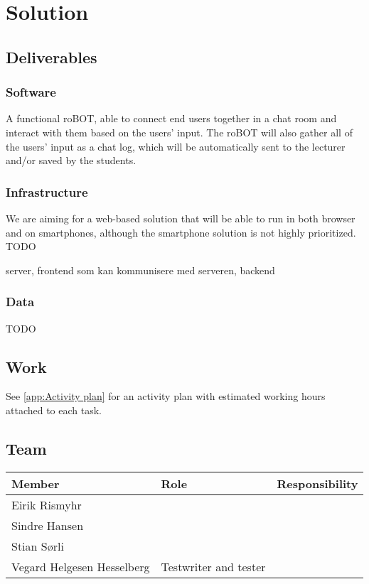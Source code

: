 \section{Solution}

\subsection{Deliverables}
\subsubsection{Software}
A functional roBOT, able to connect end users together in a chat room and interact with them based on the users' input. The roBOT will also gather all of the users' input as a chat log, which will be automatically sent to the lecturer and/or saved by the students.

\subsubsection{Infrastructure}
We are aiming for a web-based solution that will be able to run in both browser and on smartphones, although the smartphone solution is not highly prioritized. TODO

server, frontend som kan kommunisere med serveren, backend

\subsubsection{Data} 
TODO

\subsection{Work}
See \cref{app:Activity plan} for an activity plan with estimated working hours attached to each task. 

\subsection{Team}
\label{sec:Team}
\begin{adjustbox}{center}
\begin{tabular}{ l | l | l}
    Member & Role & Responsibility \\ \hline
    Eirik Rismyhr & & \\ 
    Sindre Hansen & & \\ 
    Stian Sørli & & \\ 
    Vegard Helgesen Hesselberg & Testwriter and tester & \\ 
    
\end{tabular}
\end{adjustbox}


